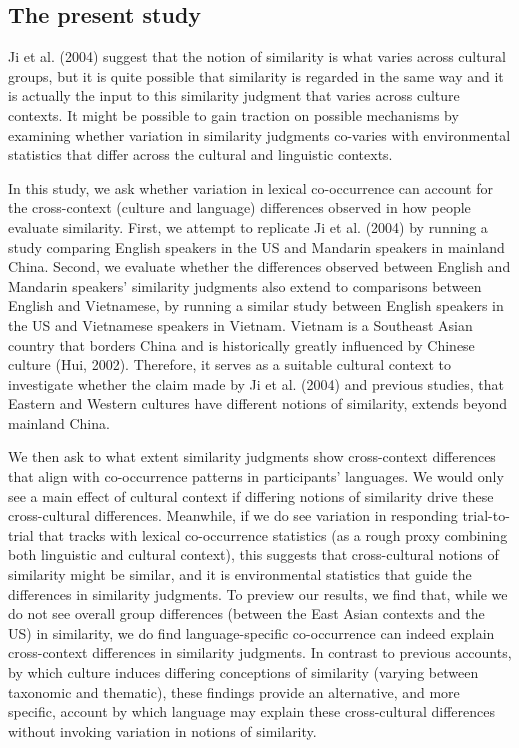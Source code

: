 \documentclass[10pt, letterpaper]{article}
\begin{document}
\hypertarget{the-present-study}{%
\subsection{The present study}\label{the-present-study}}

Ji et al. (2004) suggest that the notion of similarity is what varies
across cultural groups, but it is quite possible that similarity is
regarded in the same way and it is actually the input to this similarity
judgment that varies across culture contexts. It might be possible to
gain traction on possible mechanisms by examining whether variation in
similarity judgments co-varies with environmental statistics that differ
across the cultural and linguistic contexts.

In this study, we ask whether variation in lexical co-occurrence can
account for the cross-context (culture and language) differences
observed in how people evaluate similarity. First, we attempt to
replicate Ji et al. (2004) by running a study comparing English speakers
in the US and Mandarin speakers in mainland China. Second, we evaluate
whether the differences observed between English and Mandarin speakers'
similarity judgments also extend to comparisons between English and
Vietnamese, by running a similar study between English speakers in the
US and Vietnamese speakers in Vietnam. Vietnam is a Southeast Asian
country that borders China and is historically greatly influenced by
Chinese culture (Hui, 2002). Therefore, it serves as a suitable cultural
context to investigate whether the claim made by Ji et al. (2004) and
previous studies, that Eastern and Western cultures have different
notions of similarity, extends beyond mainland China.

We then ask to what extent similarity judgments show cross-context
differences that align with co-occurrence patterns in participants'
languages. We would only see a main effect of cultural context if
differing notions of similarity drive these cross-cultural differences.
Meanwhile, if we do see variation in responding trial-to-trial that
tracks with lexical co-occurrence statistics (as a rough proxy combining
both linguistic and cultural context), this suggests that cross-cultural
notions of similarity might be similar, and it is environmental
statistics that guide the differences in similarity judgments. To
preview our results, we find that, while we do not see overall group
differences (between the East Asian contexts and the US) in similarity,
we do find language-specific co-occurrence can indeed explain
cross-context differences in similarity judgments. In contrast to
previous accounts, by which culture induces differing conceptions of
similarity (varying between taxonomic and thematic), these findings
provide an alternative, and more specific, account by which language may
explain these cross-cultural differences without invoking variation in
notions of similarity.
\end{document}
